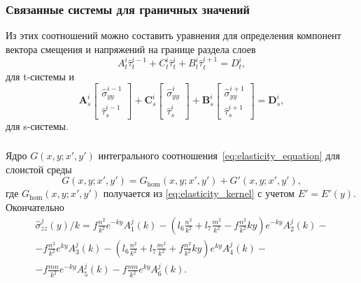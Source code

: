 \begin{frame}
    \frametitle{Связанные системы для граничных значений}
    Из этих соотношений можно составить уравнения для определения компонент вектора смещения и напряжений на границе раздела слоев
    \begin{equation}
        \label{eq:coupled_t-system}
        A_t^i \hat{\tau}_t^{i-1} + C_t^i \hat{\tau}_t^{i} + B_t^i \hat{\tau}_t^{i+1} = D_t^i,
    \end{equation}
    для t-системы и 
    \begin{equation}
        \label{eq:coupled_s-system}
        \textbf{A}_s^i \left[
            \begin{array}{c}
                \hat{\sigma}_{yy}^{i-1} \\
                \hat{\tau}_s^{i-1}
            \end{array}\right] +
        \textbf{C}_s^i \left[
            \begin{array}{c}
                \hat{\sigma}_{yy}^{i} \\
                \hat{\tau}_s^{i}
            \end{array}\right] + 
        \textbf{B}_s^i \left[
            \begin{array}{c}
                \hat{\sigma}_{yy}^{i+1} \\
                \hat{\tau}_s^{i+1}
            \end{array}\right]
        = \textbf{D}_s^i,
    \end{equation}
    для s-системы.
\end{frame}

\begin{frame}
    \frametitle{}
    Ядро $G(x,y;x',y')$ интегрального соотношения~\eqref{eq:elasticity_equation} для слоистой среды
    \begin{equation}
        G(x,y;x',y') = G_\text{hom}(x,y;x',y') + G'(x,y;x',y'),
    \end{equation} 
    где $G_\text{hom}(x,y;x',y')$ получается из \eqref{eq:elasticity_kernel} с учетом $E'=E'(y)$. Окончательно
    \begin{multline}
        \label{eq:fourier_sigmazz}
        \hat{\sigma}^j_{zz}(y)/k = f\frac{n^2}{k^2}e^{-ky}A^j_1(k)
        - \left(l_6\frac{n^2}{k^2}+l_7\frac{m^2}{k^2}-f\frac{n^2}{k^2}ky \right)e^{-ky}A^j_2(k) - \\
        - f\frac{n^2}{k^2}e^{ky}A^j_3(k)
        - \left(l_6\frac{n^2}{k^2}+l_7\frac{m^2}{k^2}+f\frac{n^2}{k^2}ky \right)e^{ky}A^j_4(k) - \\
        - f\frac{mn}{k^2}e^{-ky}A^j_5(k)
        - f\frac{mn}{k^2}e^{ky}A^j_6(k).
    \end{multline}
\end{frame}


